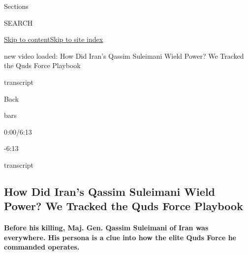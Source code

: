 Sections

SEARCH

\protect\hyperlink{site-content}{Skip to
content}\protect\hyperlink{site-index}{Skip to site index}

new video loaded: How Did Iran's Qassim Suleimani Wield Power? We
Tracked the Quds Force Playbook

transcript

Back

bars

0:00/6:13

-6:13

transcript

\hypertarget{how-did-irans-qassim-suleimani-wield-power-we-tracked-the-quds-force-playbook}{%
\subsection{How Did Iran's Qassim Suleimani Wield Power? We Tracked the
Quds Force
Playbook}\label{how-did-irans-qassim-suleimani-wield-power-we-tracked-the-quds-force-playbook}}

\hypertarget{before-his-killing-maj-gen-qassim-suleimani-of-iran-was-everywhere-his-persona-is-a-clue-into-how-the-elite-quds-force-he-commanded-operates}{%
\paragraph{Before his killing, Maj. Gen. Qassim Suleimani of Iran was
everywhere. His persona is a clue into how the elite Quds Force he
commanded
operates.}\label{before-his-killing-maj-gen-qassim-suleimani-of-iran-was-everywhere-his-persona-is-a-clue-into-how-the-elite-quds-force-he-commanded-operates}}

